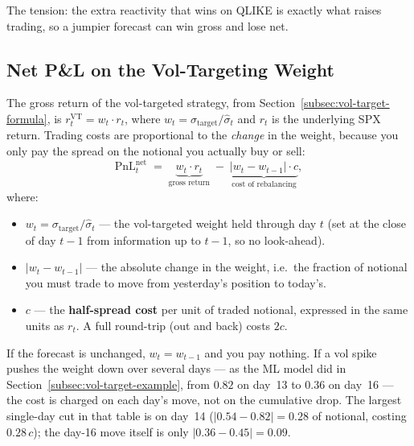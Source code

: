 The tension: the extra reactivity that wins on QLIKE is exactly what raises trading, so a jumpier forecast can win gross and lose net.

\subsection{Net P\&L on the Vol-Targeting Weight}
\label{subsec:net-pnl}

The gross return of the vol-targeted strategy, from Section~\ref{subsec:vol-target-formula}, is $r_t^{\text{VT}} = w_t \cdot r_t$, where $w_t = \sigma_{\text{target}}/\hat\sigma_t$ and $r_t$ is the underlying SPX return. Trading costs are proportional to the \emph{change} in the weight, because you only pay the spread on the notional you actually buy or sell:
\begin{equation}
\label{eq:net-pnl-vt}
\text{PnL}_t^{\text{net}} \;=\; \underbrace{w_t \cdot r_t}_{\text{gross return}} \;-\; \underbrace{|w_t - w_{t-1}| \cdot c}_{\text{cost of rebalancing}},
\end{equation}
where:
\begin{itemize}[nosep]
  \item $w_t = \sigma_{\text{target}}/\hat\sigma_t$ --- the vol-targeted weight held through day $t$ (set at the close of day $t-1$ from information up to $t-1$, so no look-ahead).
  \item $|w_t - w_{t-1}|$ --- the absolute change in the weight, i.e.\ the fraction of notional you must trade to move from yesterday's position to today's.
  \item $c$ --- the \textbf{half-spread cost} per unit of traded notional, expressed in the same units as $r_t$. A full round-trip (out and back) costs $2c$.
\end{itemize}
If the forecast is unchanged, $w_t = w_{t-1}$ and you pay nothing. If a vol spike pushes the weight down over several days --- as the ML model did in Section~\ref{subsec:vol-target-example}, from $0.82$ on day~13 to $0.36$ on day~16 --- the cost is charged on each day's move, not on the cumulative drop. The largest single-day cut in that table is on day~14 ($|0.54 - 0.82| = 0.28$ of notional, costing $0.28\,c$); the day-16 move itself is only $|0.36 - 0.45| = 0.09$.


